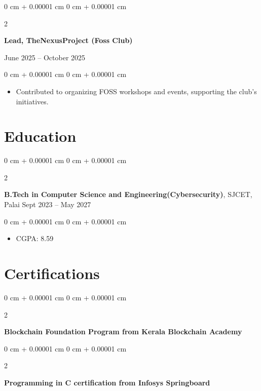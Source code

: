 \documentclass[10pt, a4paper]{article}
\newenvironment{highlights}{
    \begin{itemize}[
        topsep=0.10 cm,
        parsep=0.10 cm,
        partopsep=0pt,
        itemsep=0pt,
        leftmargin=0 cm + 10pt
    ]
}{
    \end{itemize}
} %
\newenvironment{onecolentry}{
    \begin{adjustwidth}{
        0 cm + 0.00001 cm
    }{
        0 cm + 0.00001 cm
    }
}{
    \end{adjustwidth}
} %
\newenvironment{twocolentry}[2][]{
    \onecolentry
    \def\secondColumn{#2}
    \setcolumnwidth{\fill, 4.5 cm}
    \begin{paracol}{2}
}{
    \switchcolumn \raggedleft \secondColumn
    \end{paracol}
    \endonecolentry
} %
\begin{document}
\vspace{0.2 cm}

\begin{twocolentry}{
    June 2025 – October 2025
}
    \textbf{Lead, TheNexusProject (Foss Club)}
\end{twocolentry}

\vspace{0.10 cm}
\begin{onecolentry}
    \begin{highlights}
        \item Contributed to organizing FOSS workshops and events, supporting the club's initiatives.
    \end{highlights}
\end{onecolentry}

        \vspace{0.2 cm}

    \section{Education}
     
        \begin{twocolentry}{
            Sept 2023 – May 2027
        }
            \textbf{B.Tech in Computer Science and Engineering(Cybersecurity)},   SJCET, Palai\end{twocolentry}

        \vspace{0.10 cm}
        \begin{onecolentry}
            \begin{highlights}
                \item CGPA: 8.59
            \end{highlights}
        \end{onecolentry}

        \section{Certifications}
    
            \begin{twocolentry}{
            }
                \textbf{Blockchain Foundation Program from Kerala Blockchain Academy}
                \end{twocolentry}
                
        \begin{twocolentry}{
            }
                \textbf{Programming in C certification from Infosys Springboard}
                \end{twocolentry}
\end{document}
